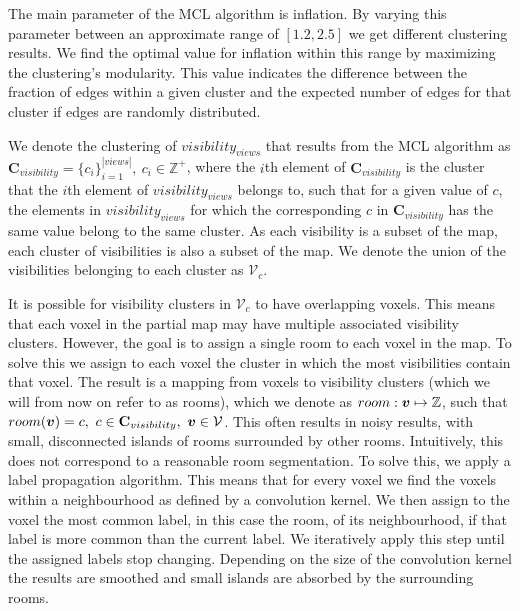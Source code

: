 The main parameter of the MCL algorithm is inflation. By varying this parameter between an approximate range of \([1.2, 2.5]\) we get different clustering results. We find the optimal value for inflation within this range by maximizing the clustering's modularity. This value indicates the difference between the fraction of edges within a given cluster and the expected number of edges for that cluster if edges are randomly distributed. 


We denote the clustering of \(visibility_{views}\) that results from the MCL algorithm as \(\mathbf{C}_{visibility} = \{c_i\}_{i=1}^{|views|},\ c_i \in \mathbb{Z}^+\), where the \(i\)th element of \(\mathbf{C}_{visibility}\) is the cluster that the \(i\)th element of \(visibility_{views}\) belongs to, such that for a given value of \(c\), the elements in \(visibility_{views}\) for which the corresponding \(c\) in \(\mathbf{C}_{visibility}\) has the same value belong to the same cluster. As each visibility is a subset of the map, each cluster of visibilities is also a subset of the map. We denote the union of the visibilities belonging to each cluster as \(\mathcal{V}_{c}\). 

It is possible for visibility clusters in \(\mathcal{V}_{c}\) to have overlapping voxels. This means that each voxel in the partial map may have multiple associated visibility clusters. However, the goal is to assign a single room to each voxel in the map. To solve this we assign to each voxel the cluster in which the most visibilities contain that voxel. The result is a mapping from voxels to visibility clusters (which we will from now on refer to as rooms), which we denote as \(room: \boldsymbol{v} \mapsto \mathbb{Z}\), such that \(room(\boldsymbol{v}) = c,\ c \in \mathbf{C}_{visibility},\ \boldsymbol{v} \in \mathcal{V}\). This often results in noisy results, with small, disconnected islands of rooms surrounded by other rooms. Intuitively, this does not correspond to a reasonable room segmentation. To solve this, we apply a label propagation algorithm. This means that for every voxel we find the voxels within a neighbourhood as defined by a convolution kernel. We then assign to the voxel the most common label, in this case the room, of its neighbourhood, if that label is more common than the current label. We iteratively apply this step until the assigned labels stop changing. Depending on the size of the convolution kernel the results are smoothed and small islands are absorbed by the surrounding rooms.


